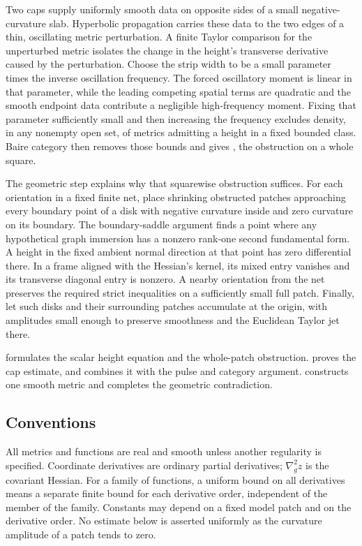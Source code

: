 \documentclass[11pt]{amsart}
\theoremstyle{definition}
\theoremstyle{remark}
\numberwithin{equation}{section}
\begin{document}
Two caps supply uniformly smooth data on opposite sides of a small
negative-curvature slab. Hyperbolic propagation carries these data
to the two edges of a thin, oscillating metric perturbation.
A finite Taylor comparison for the unperturbed metric isolates the
change in the height's transverse derivative caused by the perturbation.
Choose the strip width to be a small parameter times the inverse
oscillation frequency. The forced oscillatory moment is linear in
that parameter, while the leading competing spatial terms are quadratic
and the smooth endpoint data contribute a negligible high-frequency
moment. Fixing that parameter sufficiently small and then increasing
the frequency excludes density, in any nonempty open set, of metrics
admitting a height in a fixed bounded class.
Baire category then removes those bounds and gives ,
the obstruction on a whole square.

The geometric step explains why that squarewise obstruction suffices.
For each orientation in a fixed finite net, place shrinking obstructed
patches approaching every boundary point of a disk with negative
curvature inside and zero curvature on its boundary.
The boundary-saddle
argument finds a point where any hypothetical graph immersion has a
nonzero rank-one second fundamental form. A height in the fixed ambient
normal direction at that point has zero differential there.
In a frame aligned with the
Hessian's kernel, its mixed entry vanishes and its transverse diagonal
entry is nonzero. A nearby orientation from the net preserves the
required strict inequalities on a sufficiently small full patch.
Finally, let such disks and their surrounding
patches accumulate at the origin, with amplitudes small enough to
preserve smoothness and the Euclidean Taylor jet there.

 formulates the scalar height equation and the
whole-patch obstruction.  proves the cap estimate,
and  combines it with the pulse and category
argument.  constructs one smooth metric and
completes the geometric contradiction.

\subsection*{Conventions}
All metrics and functions are real and smooth unless another regularity
is specified. Coordinate derivatives are ordinary partial derivatives;
\(\nabla_g^2z\) is the covariant Hessian. For a family of functions,
a uniform bound on all derivatives means a separate finite bound for
each derivative order, independent of the member of the family.
Constants may depend on a fixed model patch and on the derivative
order. No estimate below is asserted uniformly as the curvature
amplitude of a patch tends to zero.








\end{document}
